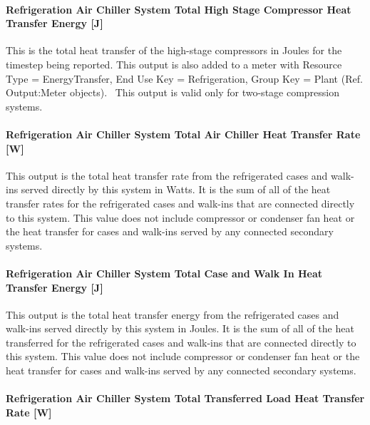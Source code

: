 \paragraph{Refrigeration Air Chiller System Total High Stage Compressor Heat Transfer Energy {[}J{]}}\label{refrigeration-air-chiller-system-total-high-stage-compressor-heat-transfer-energy-j}

This is the total heat transfer of the high-stage compressors in Joules for the timestep being reported. This output is also added to a meter with Resource Type = EnergyTransfer, End Use Key = Refrigeration, Group Key = Plant (Ref. Output:Meter objects).~ This output is valid only for two-stage compression systems.

\paragraph{Refrigeration Air Chiller System Total Air Chiller Heat Transfer Rate {[}W{]}}\label{refrigeration-air-chiller-system-total-air-chiller-heat-transfer-rate-w}

This output is the total heat transfer rate from the refrigerated cases and walk-ins served directly by this system in Watts. It is the sum of all of the heat transfer rates for the refrigerated cases and walk-ins that are connected directly to this system. This value does not include compressor or condenser fan heat or the heat transfer for cases and walk-ins served by any connected secondary systems.

\paragraph{Refrigeration Air Chiller System Total Case and Walk In Heat Transfer Energy {[}J{]}}\label{refrigeration-air-chiller-system-total-case-and-walk-in-heat-transfer-energy-j}

This output is the total heat transfer energy from the refrigerated cases and walk-ins served directly by this system in Joules. It is the sum of all of the heat transferred for the refrigerated cases and walk-ins that are connected directly to this system. This value does not include compressor or condenser fan heat or the heat transfer for cases and walk-ins served by any connected secondary systems.

\paragraph{Refrigeration Air Chiller System Total Transferred Load Heat Transfer Rate {[}W{]}}\label{refrigeration-air-chiller-system-total-transferred-load-heat-transfer-rate-w}

